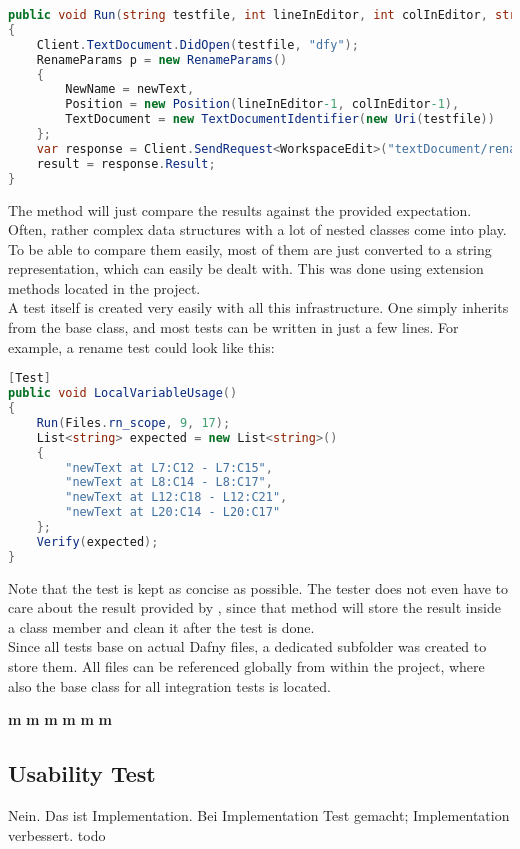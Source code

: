\begin{lstlisting}[language=csharp, caption={Finding a Declaration}, captionpos=b, label={lst:visitorfinddecl}]
public void Run(string testfile, int lineInEditor, int colInEditor, string newText = "newText")
{
    Client.TextDocument.DidOpen(testfile, "dfy");
    RenameParams p = new RenameParams()
    {
        NewName = newText,
        Position = new Position(lineInEditor-1, colInEditor-1),
        TextDocument = new TextDocumentIdentifier(new Uri(testfile))
    };
    var response = Client.SendRequest<WorkspaceEdit>("textDocument/rename", p, CancellationSource.Token);
    result = response.Result;
}
\end{lstlisting}

The  method will just compare the results against the provided expectation. Often, rather complex data structures with a lot of nested classes come into play. To be able to compare them easily, most of them are just converted to a string representation, which can easily be dealt with. This was done using extension methods located in the  project.\\

A test itself is created very easily with all this infrastructure. One simply inherits from the base class, and most tests can be written in just a few lines. For example, a rename test could look like this:

\begin{lstlisting}[language=csharp, caption={Sample Integration Test}, captionpos=b, label={lst:sampleintegrationtest}]
[Test]
public void LocalVariableUsage()
{
    Run(Files.rn_scope, 9, 17);
    List<string> expected = new List<string>()
    {
        "newText at L7:C12 - L7:C15",
        "newText at L8:C14 - L8:C17",
        "newText at L12:C18 - L12:C21",
        "newText at L20:C14 - L20:C17"
    };
    Verify(expected);
}
\end{lstlisting}

Note that the test is kept as concise as possible. The tester does not even have to care about the result provided by , since that method will store the result inside a class member and clean it after the test is done.\\

Since all tests base on actual Dafny files, a dedicated subfolder was created to store them. All files can be referenced globally from within the  project, where also the base class for all integration tests is located.




\textbf{m}
\textbf{m}
\textbf{m}
\textbf{m}
\textbf{m}
\textbf{m}



\subsection{Usability Test}
Nein. Das ist Implementation. Bei Implementation Test gemacht; Implementation verbessert.
todo
